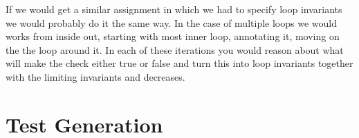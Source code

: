 \documentclass[a4paper]{article}
\begin{document}
	If we would get a similar assignment in which we had to specify loop invariants we would probably do it the same way. In the case of multiple loops we would works from inside out, starting with most inner loop, annotating it, moving on the the loop around it. In each of these iterations you would reason about what will make the check either true or false and turn this into loop invariants together with the limiting invariants and decreases.
	
	\section{Test Generation}
	
	
	
\end{document}
